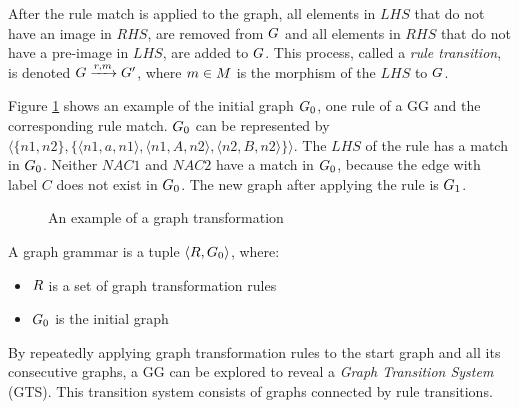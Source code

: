 \vspace{5px}
\begin{definition}
After the rule match is applied to the graph, all elements in $\mathit{LHS}$ that do not have an image in $\mathit{RHS}$, are removed from $G$ and all elements in $\mathit{RHS}$ that do not have a pre-image in $\mathit{LHS}$, are added to $G$. This process, called a \textit{rule transition}, is denoted $G \xrightarrow{r, m}G'$, where $m \in M$ is the morphism of the $\mathit{LHS}$ to $G$.
\end{definition}
\vspace{5px}

Figure \ref{fig:gg_example} shows an example of the initial graph $G_0$, one rule of a GG and the corresponding rule match. $G_0$ can be represented by $\langle\{n1,n2\},\{\langle n1,a,n1\rangle, \langle n1,A,n2\rangle,\langle n2,B,n2\rangle\}\rangle$. The $\mathit{LHS}$ of the rule has a match in $G_0$. Neither $\mathit{NAC1}$ and $\mathit{NAC2}$ have a match in $G_0$, because the edge with label $C$ does not exist in $G_0$. The new graph after applying the rule is $G_1$.

\begin{figure}[ht]
  \begin{center}
    
  \end{center}
  \caption{An example of a graph transformation}
  \label{fig:gg_example}
\end{figure}

\vspace{5px}
\begin{definition}
A graph grammar is a tuple $\langle R, G_0 \rangle$, where:
\begin{itemize}
\item $R$ is a set of graph transformation rules
\item $G_0$ is the initial graph
\end{itemize}
\end{definition}
\vspace{5px}

By repeatedly applying graph transformation rules to the start graph and all its consecutive graphs, a GG can be explored to reveal a \textit{Graph Transition System} (GTS). This transition system consists of graphs connected by rule transitions.

